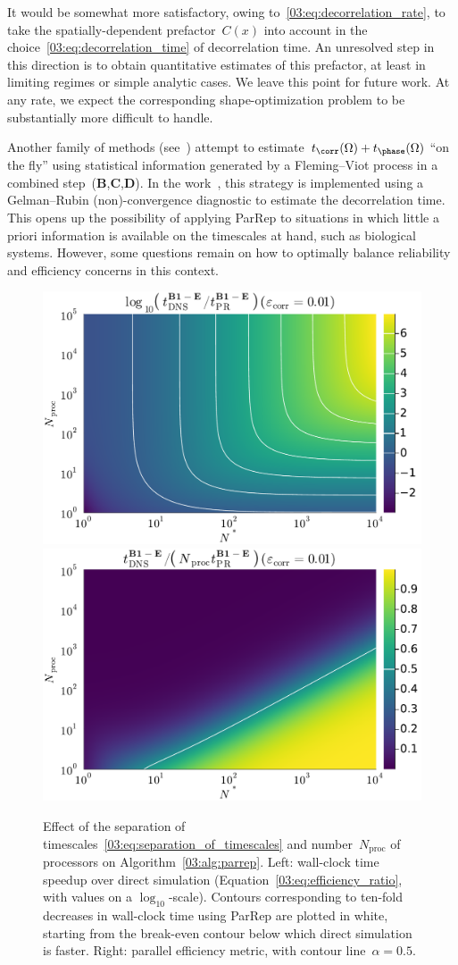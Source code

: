     \begin{remark}
        It would be somewhat more satisfactory, owing to~\eqref{03:eq:decorrelation_rate}, to take the spatially-dependent prefactor~$C(x)$ into account in the choice~\eqref{03:eq:decorrelation_time} of decorrelation time. An unresolved step in this direction is to obtain quantitative estimates of this prefactor, at least in limiting regimes or simple analytic cases. We leave this point for future work.
        At any rate, we expect the corresponding shape-optimization problem to be substantially more difficult to handle.
    \end{remark}

    Another family of methods (see~\cite{HL19}) attempt to estimate~$t_{\corr}(\Omega)+t_{\phase}(\Omega)$ ``on the fly'' using statistical information generated by a Fleming--Viot process in a combined step~({\bf B},{\bf C},{\bf D}).
    In the work~\cite{HL19}, this strategy is implemented using a Gelman--Rubin (non)-convergence diagnostic to estimate the decorrelation time. This opens up the possibility of applying ParRep to situations in which little a priori information is available on the timescales at hand, such as biological systems.
    However, some questions remain on how to optimally balance reliability and efficiency concerns in this context.

    \begin{figure}
    \centering
    \includegraphics[width=0.49\linewidth]{figures/03/intro/logspeedup.pdf}
    \includegraphics[width=0.49\linewidth]{figures/03/intro/parallel_efficiency.pdf}
    \caption[]{Effect of the separation of timescales~\eqref{03:eq:separation_of_timescales} and number~$N_{\mathrm{proc}}$ of processors on Algorithm~\ref{03:alg:parrep}. Left: wall-clock time speedup over direct simulation (Equation~\eqref{03:eq:efficiency_ratio}, with values on a $\log_{10}$-scale). Contours corresponding to ten-fold decreases in wall-clock time using ParRep are plotted in white, starting from the break-even contour below which direct simulation is faster. Right: parallel efficiency metric, with contour line~$\alpha=0.5$.}
    \label{03:fig:parrep}
    \end{figure}

